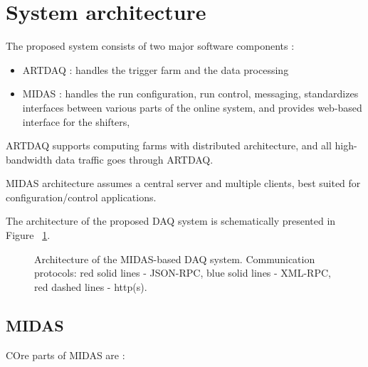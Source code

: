 \section{System architecture}

The proposed system consists of two major software components :
\begin{itemize}
\item
  ARTDAQ : handles the trigger farm and the data processing
\item
  MIDAS : handles the run configuration, run control, messaging,
  standardizes interfaces between various parts of the online system,
  and provides web-based interface for the shifters,
\end{itemize}

ARTDAQ supports computing farms with distributed architecture, 
and all high-bandwidth data traffic goes through ARTDAQ.

MIDAS architecture assumes a central server and multiple clients,
best suited for configuration/control applications.

The architecture of the proposed DAQ system is schematically presented
in Figure ~\ref{figure:system_architecture}.

\begin{figure}[H]
  \caption{
    \label{figure:system_architecture}
    Architecture of the MIDAS-based DAQ system. Communication protocols:
    red solid lines - JSON-RPC, blue solid lines - XML-RPC,
    red dashed lines - http(s).
  }
\end{figure}

\subsection{MIDAS}

COre parts of MIDAS are :

